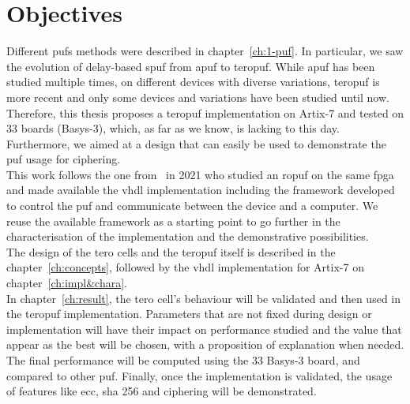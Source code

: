 \chapter{Objectives}

Different \acrshort{puf}s methods were described in chapter~\ref{ch:1-puf}. In particular, we saw the evolution of delay-based \acrshort{spuf} from \acrshort{apuf} to \acrshort{teropuf}. While \acrshort{apuf} has been studied multiple times, on different devices with diverse variations, \acrshort{teropuf} is more recent and only some devices and variations have been studied until now.\\

Therefore, this thesis proposes a \acrshort{teropuf} implementation on Artix-7 and tested on 33 boards (Basys-3), which, as far as we know, is lacking to this day. Furthermore, we aimed at a design that can easily be used to demonstrate the \acrshort{puf} usage for ciphering.\\

This work follows the one from~\cite{de_weerdt_implementation_2021} in 2021 who studied an \acrshort{ropuf} on the same \acrshort{fpga} and made available the \acrshort{vhdl} implementation including the framework developed to control the \acrshort{puf} and communicate between the device and a computer. We reuse the available framework as a starting point to go further in the characterisation of the implementation and the demonstrative possibilities.\\

The design of the \acrshort{tero} cells and the \acrshort{teropuf} itself is described in the chapter~\ref{ch:concepts}, followed by the \acrshort{vhdl} implementation for Artix-7 on chapter~\ref{ch:impl&chara}.\\

In chapter~\ref{ch:result}, the \acrshort{tero} cell's behaviour will be validated and then used in the \acrshort{teropuf} implementation. Parameters that are not fixed during design or implementation will have their impact on performance studied and the value that appear as the best will be chosen, with a proposition of explanation when needed. The final performance will be computed using the 33 Basys-3 board, and compared to other \acrshort{puf}. Finally, once the implementation is validated, the usage of features like \acrshort{ecc}, \acrfull{sha} 256 and ciphering will be demonstrated.